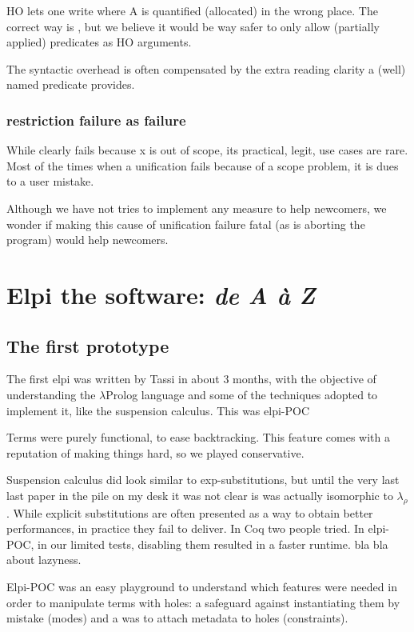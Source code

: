 \documentclass[a4paper, 11pt]{book}
\begin{document}
HO lets one write 
where A is quantified (allocated) in the wrong place.
The correct way is ,
but we believe it would be way safer to only allow (partially
applied) predicates as HO arguments.

The syntactic overhead is often compensated by the extra
reading clarity a (well) named predicate provides.

\subsection{restriction failure as failure}

While  clearly fails because x is
out of scope, its practical, legit, use cases are rare.
Most of the times when a unification fails because of
a scope problem, it is dues to a user mistake.

Although we have not tries to implement any measure to help
newcomers, we wonder if making this cause of unification failure
fatal (as is aborting the program) would help newcomers.


\chapter{Elpi the software: \emph{de A \`a Z}}

\section{The first prototype}

The first elpi was written by Tassi in about 3 months, with the objective
of understanding the $\lambda$Prolog language and some of the techniques
adopted to implement it, like the suspension calculus. This was elpi-POC

Terms were purely functional, to ease backtracking. This feature comes
with a reputation of making things hard, so we played conservative.

Suspension calculus did look similar to exp-substitutions, but until the very
last last paper in the pile on my desk it was not clear is was actually isomorphic
to $\lambda_\rho$. While explicit substitutions are often presented as a way to
obtain better performances, in practice they fail to deliver. In Coq two
people tried. In elpi-POC, in our limited tests, disabling them resulted in
a faster runtime.  bla bla about lazyness.

Elpi-POC was an easy playground to understand which features were needed in
order to manipulate terms with holes: a safeguard against instantiating them by
mistake (modes) and a was to attach metadata to holes (constraints).
\end{document}
